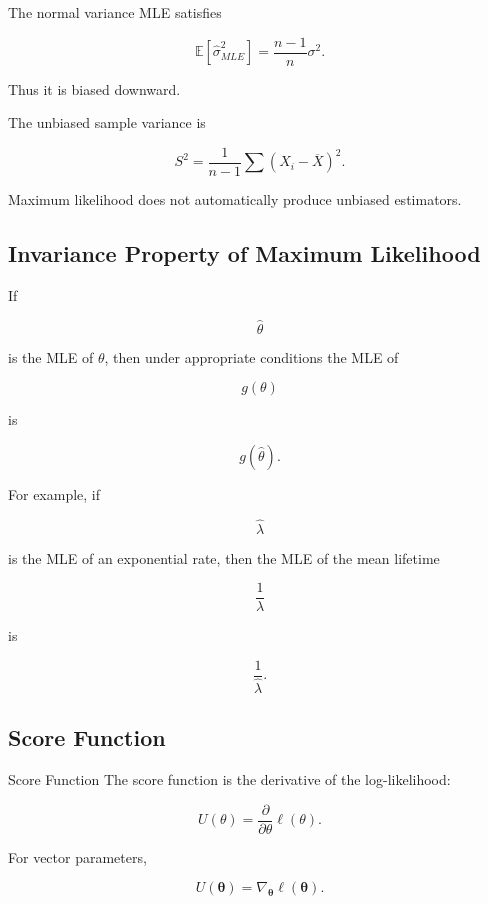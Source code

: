The normal variance MLE satisfies

\[
\boxed{
\mathbb{E}
[
\widehat{\sigma}^2_{MLE}
]
=
\frac{
n-1
}{n}
\sigma^2.
}
\]

Thus it is biased downward.

The unbiased sample variance is

\[
\boxed{
S^2
=
\frac1{n-1}
\sum
(
X_i-\overline{X}
)^2.
}
\]

Maximum likelihood does not automatically produce unbiased estimators.

\subsection{Invariance Property of Maximum Likelihood}
\label{subsec:mle-invariance}

If

\[
\widehat{\theta}
\]

is the MLE of \(\theta\), then under appropriate conditions the MLE of

\[
g(\theta)
\]

is

\[
\boxed{
g(\widehat{\theta}).
}
\]

For example, if

\[
\widehat{\lambda}
\]

is the MLE of an exponential rate, then the MLE of the mean lifetime

\[
\frac1\lambda
\]

is

\[
\boxed{
\frac1{\widehat{\lambda}}.
}
\]

\subsection{Score Function}
\label{subsec:score-function}

\begin{definitionbox}{Score Function}
The score function is the derivative of the log-likelihood:

\[
\boxed{
U(\theta)
=
\frac{
\partial
}{
\partial\theta
}
\ell(\theta).
}
\]
\end{definitionbox}

For vector parameters,

\[
\boxed{
U(\boldsymbol{\theta})
=
\nabla_{\boldsymbol{\theta}}
\ell(\boldsymbol{\theta}).
}
\]


